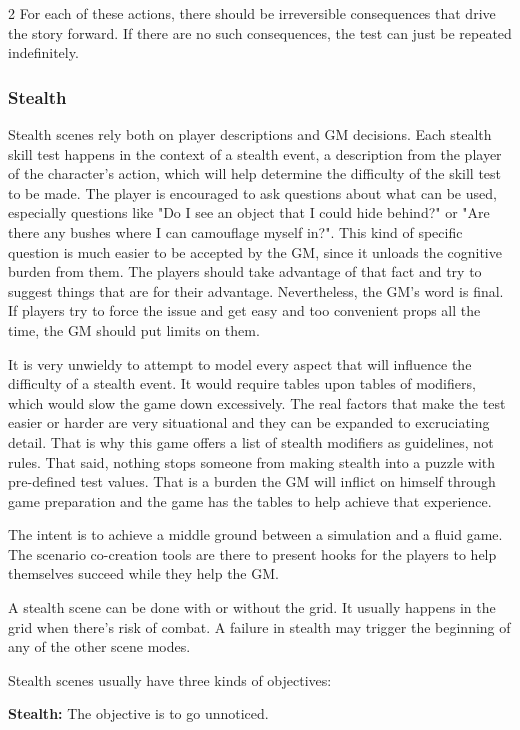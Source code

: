 \begin{multicols}{2}
For each of these actions, there should be irreversible consequences that drive the story forward. If there are no such consequences, the test can just be repeated indefinitely.

\subsubsection{Stealth}

Stealth scenes rely both on player descriptions and GM decisions. Each stealth skill test happens in the context of a stealth event, a description from the player of the character's action, which will help determine the difficulty of the skill test to be made. The player is encouraged to ask questions about what can be used, especially questions like "Do I see an object that I could hide behind?" or "Are there any bushes where I can camouflage myself in?". This kind of specific question is much easier to be accepted by the GM, since it unloads the cognitive burden from them. The players should take advantage of that fact and try to suggest things that are for their advantage. Nevertheless, the GM's word is final. If players try to force the issue and get easy and too convenient props all the time, the GM should put limits on them.

It is very unwieldy to attempt to model every aspect that will influence the difficulty of a stealth event. It would require tables upon tables of modifiers, which would slow the game down excessively. The real factors that make the test easier or harder are very situational and they can be expanded to excruciating detail. That is why this game offers a list of stealth modifiers as guidelines, not rules. That said, nothing stops someone from making stealth into a puzzle with pre-defined test values. That is a burden the GM will inflict on himself through game preparation and the game has the tables to help achieve that experience.

The intent is to achieve a middle ground between a simulation and a fluid game. The scenario co-creation tools are there to present hooks for the players to help themselves succeed while they help the GM.

A stealth scene can be done with or without the grid. It usually happens in the grid when there's risk of combat. A failure in stealth may trigger the beginning of any of the other scene modes.

Stealth scenes usually have three kinds of objectives:

\textbf{Stealth:} The objective is to go unnoticed.


\end{multicols}
